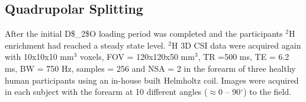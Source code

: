 


\subsection{Quadrupolar Splitting}

After the initial \ac{D$_2$O} loading period was completed and the participants $^2$H enrichment had reached a steady state level. $^2$H 3D \ac{CSI} data were acquired again with 10x10x10 mm$^3$ voxels, \ac{FOV} = 120x120x50 mm$^3$, \ac{TR} =500 ms, \ac{TE} = 6.2 ms, \ac{BW} = 750 Hz, samples = 256 and NSA = 2 in the forearm of three healthy human participants using an in-house built Helmholtz coil. Images were acquired in each subject with the forearm at 10 different angles ($\approx$0 – 90$^\circ$) to the field. 


